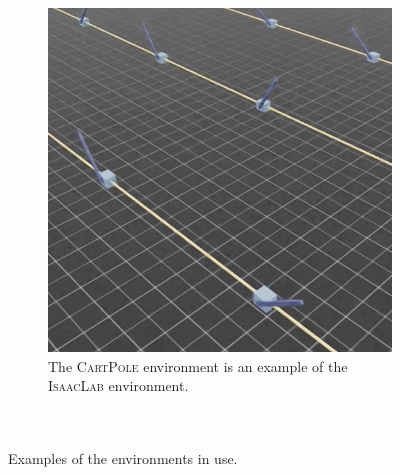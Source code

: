 \documentclass[10pt]{article} %
\begin{document}
\begin{figure}
\begin{subfigure}[b]{0.32\textwidth}
    \includegraphics[width=\textwidth]{figures/isaac.png}
    \caption{The \textsc{CartPole} environment is an example of the \textsc{IsaacLab} environment.\\\textcolor{white}{.}\\\textcolor{white}{.}\\}
    \label{fig:sample-env-isaac}
  \end{subfigure}
  \caption{Examples of the environments in use.}
  \vspace{-12pt}
  \label{fig:environmnents}
\end{figure}
\end{document}
